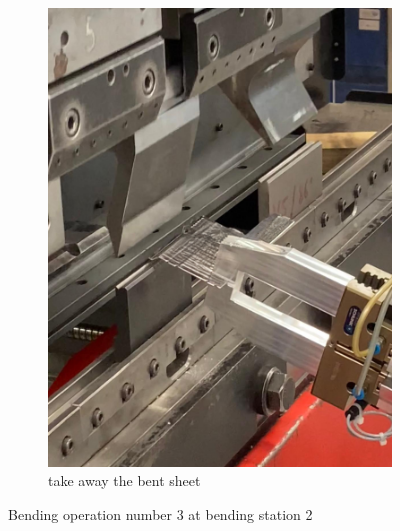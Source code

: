 \begin{figure}[h]
\begin{subfigure}[b]{0.32\textwidth}
        \includegraphics[width=\textwidth]{figures/bending/bending3-003.png}
        \caption{take away the bent sheet}
        \label{subfig:bending3-after}
    \end{subfigure}\hspace{0.1cm}
    \caption{Bending operation number 3 at bending station 2}
    \label{fig:bending-operation-3}
\end{figure}

